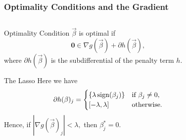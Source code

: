 \documentclass[10pt]{beamer}
\begin{document}
\begin{frame}[c]
  \frametitle{Optimality Conditions and the Gradient}

  \begin{columns}
    \begin{column}{0.51\textwidth}
      \begin{block}{Optimality Condition}
        \(\vec{\beta}\) is optimal if
        \begin{equation*}
          \boldsymbol{0} \in \nabla g(\vec{\beta}) + \partial h(\vec{\beta}),
        \end{equation*}
        where \(\partial h (\vec{\beta})\) is the subdifferential of the penalty term \(h\).
      \end{block}

      \pause

      \begin{block}{The Lasso}
        Here we have
        \[
          \partial h (\beta)_j =
          \begin{cases}
            \{
            \lambda\operatorname{sign}(\beta_j)\} & \text{if } \beta_j \neq 0, \\
            [-\lambda, \lambda]     & \text{otherwise}.
          \end{cases}
        \]
        Hence, if \(|\nabla g(\vec{\beta})_j| < \lambda,\) then \(\beta_j^* = 0\).
      \end{block}

    \end{column}
    \begin{column}{0.39\textwidth}


\end{column}
\end{columns}
\end{frame}
\end{document}
